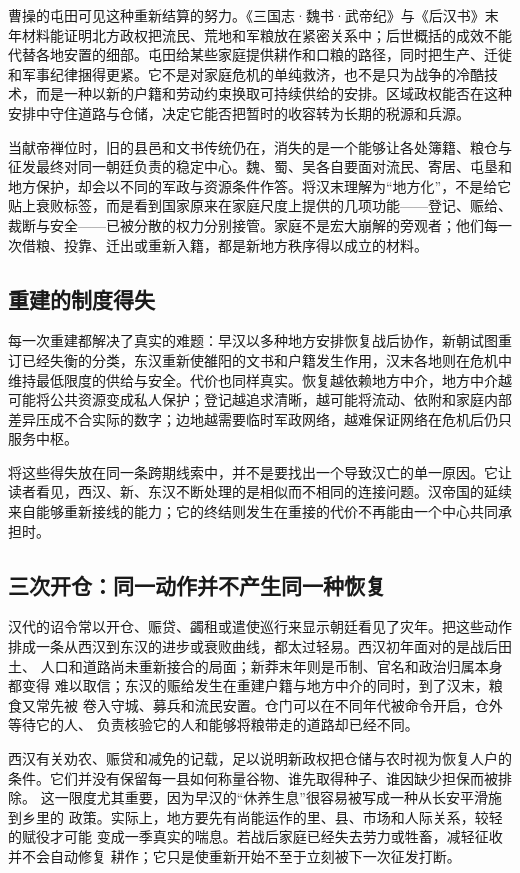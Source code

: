 曹操的屯田可见这种重新结算的努力。《三国志·魏书·武帝纪》与《后汉书》末年材料能证明北方政权把流民、荒地和军粮放在紧密关系中；后世概括的成效不能代替各地安置的细部。屯田给某些家庭提供耕作和口粮的路径，同时把生产、迁徙和军事纪律捆得更紧。它不是对家庭危机的单纯救济，也不是只为战争的冷酷技术，而是一种以新的户籍和劳动约束换取可持续供给的安排。区域政权能否在这种安排中守住道路与仓储，决定它能否把暂时的收容转为长期的税源和兵源。

当献帝禅位时，旧的县邑和文书传统仍在，消失的是一个能够让各处簿籍、粮仓与征发最终对同一朝廷负责的稳定中心。魏、蜀、吴各自要面对流民、寄居、屯垦和地方保护，却会以不同的军政与资源条件作答。将汉末理解为“地方化”，不是给它贴上衰败标签，而是看到国家原来在家庭尺度上提供的几项功能——登记、赈给、裁断与安全——已被分散的权力分别接管。家庭不是宏大崩解的旁观者；他们每一次借粮、投靠、迁出或重新入籍，都是新地方秩序得以成立的材料。
\subsection{重建的制度得失}

每一次重建都解决了真实的难题：早汉以多种地方安排恢复战后协作，新朝试图重订已经失衡的分类，东汉重新使雒阳的文书和户籍发生作用，汉末各地则在危机中维持最低限度的供给与安全。代价也同样真实。恢复越依赖地方中介，地方中介越可能将公共资源变成私人保护；登记越追求清晰，越可能将流动、依附和家庭内部差异压成不合实际的数字；边地越需要临时军政网络，越难保证网络在危机后仍只服务中枢。

将这些得失放在同一条跨期线索中，并不是要找出一个导致汉亡的单一原因。它让读者看见，西汉、新、东汉不断处理的是相似而不相同的连接问题。汉帝国的延续来自能够重新接线的能力；它的终结则发生在重接的代价不再能由一个中心共同承担时。

\subsection{三次开仓：同一动作并不产生同一种恢复}

汉代的诏令常以开仓、赈贷、蠲租或遣使巡行来显示朝廷看见了灾年。把这些动作
排成一条从西汉到东汉的进步或衰败曲线，都太过轻易。西汉初年面对的是战后田土、
人口和道路尚未重新接合的局面；新莽末年则是币制、官名和政治归属本身都变得
难以取信；东汉的赈给发生在重建户籍与地方中介的同时，到了汉末，粮食又常先被
卷入守城、募兵和流民安置。仓门可以在不同年代被命令开启，仓外等待它的人、
负责核验它的人和能够将粮带走的道路却已经不同。

西汉有关劝农、赈贷和减免的记载，足以说明新政权把仓储与农时视为恢复人户的
条件。它们并没有保留每一县如何称量谷物、谁先取得种子、谁因缺少担保而被排除。
这一限度尤其重要，因为早汉的“休养生息”很容易被写成一种从长安平滑施到乡里的
政策。实际上，地方要先有尚能运作的里、县、市场和人际关系，较轻的赋役才可能
变成一季真实的喘息。若战后家庭已经失去劳力或牲畜，减轻征收并不会自动修复
耕作；它只是使重新开始不至于立刻被下一次征发打断。


